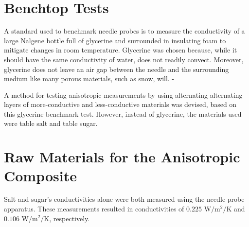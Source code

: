 \section{Benchtop Tests}

A standard used to benchmark needle probes is to measure the conductivity of a
large Nalgene bottle full of glycerine and surrounded in insulating foam to
mitigate changes in room temperature. Glycerine was chosen because, while it
should have the same conductivity of water, does not readily convect. Moreover,
glycerine does not leave an air gap between the needle and the surrounding
medium like many porous materials, such as snow, will. -

A method for testing anisotropic measurements by using alternating alternating
layers of more-conductive and less-conductive materials was devised, based on
this glycerine benchmark test. However, instead of glycerine, the materials
used were table salt and table sugar.

\section{Raw Materials for the Anisotropic Composite}

Salt and sugar's conductivities alone were both measured using the needle probe
apparatus. These measurements resulted in conductivities of
\(0.225\) \(\textrm{W}/\textrm{m}^2/\textrm{K}\) and 
\(0.106\) \(\textrm{W}/\textrm{m}^2/\textrm{K}\), respectively.

